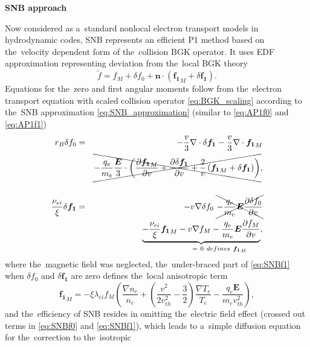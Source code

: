 \documentclass[
 aps,
 jmp,
 amsmath,amssymb,
 twocolumn,
]{revtex4-1}
\newcommand{\pdv}[2]{\frac{\partial{#1}}{\partial{#2}}}
\newcommand{\vect}[1]{\boldsymbol{#1}}
\newcommand{\mfpei}{\lambda_{ei}}
\newcommand{\nuei}{\nu_{ei}}
\newcommand{\vmag}{v}
\newcommand{\vth}{v_{th}}
\newcommand{\vn}{\vect{n}}
\newcommand{\E}{\vect{E}}
\newcommand{\B}{\vect{B}}
\newcommand{\omegaB}{\vect{\omega}_{B}}
\newcommand{\qe}{q_e}
\newcommand{\me}{m_e}
\newcommand{\Te}{T_e}
\newcommand{\ed}{n_e}
\newcommand{\fM}{f_M}
\newcommand{\fzero}{f_0}
\newcommand{\fone}{{\vect{f_1}}}
\newcommand{\ft}{f}
\begin{document}
\textbf{SNB approach}

Now considered as a~standard nonlocal electron transport models in hydrodynamic 
codes, SNB \cite{Schurtz_2000} represents an efficient P1 method based on
the~velocity dependent form of the~collision BGK operator. It uses EDF 
approximation representing deviation from the~local BGK theory
\begin{equation}
  \tilde{\ft} = 
  \fM + \delta\fzero 
  + \vn\cdot\left(\fone_M + \delta\fone\right) . 
  \label{eq:SNB_approximation}
\end{equation}
Equations for the~zero and first angular moments follow from 
the~electron transport equation with scaled collision operator 
\eqref{eq:BGK_scaling}
according to the~SNB approximation \eqref{eq:SNB_approximation} 
(similar to \eqref{eq:AP1f0} and \eqref{eq:AP1f1})
\begin{eqnarray}
  r_B \delta\fzero &=&
  - \frac{\vmag}{3}\nabla\cdot\delta\fone
  - \frac{\vmag}{3}\nabla\cdot\fone_M
  \nonumber\\ 
  &&\xcancel{- \frac{\qe}{\me}\frac{\E}{3}\cdot\left(
  \pdv{\fone_M}{\vmag} + \pdv{\delta\fone}{\vmag} 
  + \frac{2}{\vmag}\left(\fone_M + \delta\fone\right)\right)} , 
  \nonumber \\
  \label{eq:SNBf0}\\
  \frac{\nuei}{\xi}\delta\fone &=& - \vmag\nabla\delta\fzero 
  ~\xcancel{- \frac{\qe}{\me}\E\pdv{\delta\fzero}{\vmag}}
  \nonumber \\
  &&\underbrace{- \frac{\nuei}{\xi}\fone_M - \vmag\nabla\fM
  - \frac{\qe}{\me}\E\pdv{\fM}{\vmag}
  }_{~~~~~~~~~~~~~=~0~defines~\fone_M} 
  ,
  \nonumber \\
  \label{eq:SNBf1}
\end{eqnarray}
where the~magnetic field was neglected, the~under-braced part
of \eqref{eq:SNBf1} when $\delta\fzero$ and $\delta \fone$ are zero
defines the~local anisotropic term
\begin{equation}
  \fone_M = -\xi\mfpei\fM\left( \frac{\nabla\ed}{\ed} 
+ \left( \frac{\vmag^2}{2\vth^2} - \frac{3}{2}\right)
\frac{\nabla\Te}{\Te} - \frac{\qe\E}{\me\vth^2}\right) ,
  \label{eq:f1M}
\end{equation}
and the~efficiency of SNB resides in omitting the~electric field 
effect (crossed out terms in \eqref{eq:SNBf0} and \eqref{eq:SNBf1}), which
leads to a~simple diffusion equation for the~correction to the~isotropic 
\end{document}
